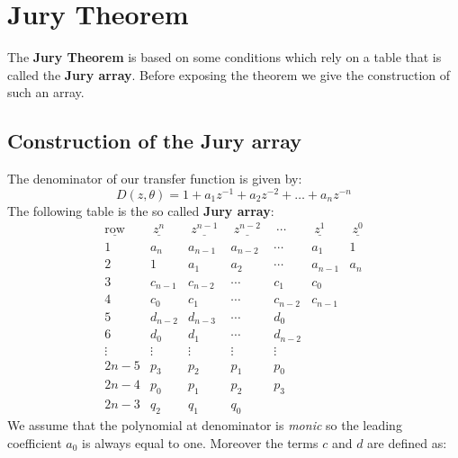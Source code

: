 \section{Jury Theorem}
The \textbf{Jury Theorem} is based on some conditions which rely on a table that is called the \textbf{Jury array}. Before exposing the theorem we give the construction of such an array. 

\subsection{Construction of the Jury array}
The denominator of our transfer function is given by: 
\begin{equation}
    D(z,\theta)=1+a_1{z^{-1}}+a_2{z^{-2}}+\dots+a_n{z^{-n}}
\end{equation}
The following table is the so called \textbf{Jury array}:
\begin{equation}
    {\displaystyle {\begin{array}{lcccccc}
        {\underline {\text{row}}} &\ {\underline {z^{n}}}\ &\ {\underline {z^{n-1}}}\ &\ {\underline {z^{n-2}}}\ &\ \cdots \ &\ {\underline {z^{1}}}\ &\ {\underline {z^{0}}} \\[8pt]
        1 & a_{n} & a_{n-1} & a_{n-2} & \cdots & a_{1} & 1 \\[4pt]
        2 & 1 & a_{1} & a_{2} & \cdots & a_{n-1} & a_{n} \\[10pt]
        3 & c_{n-1} & c_{n-2} & \cdots & c_{1} & c_{0} \\[4pt]
        4 & c_{0} & c_{1} & \cdots & c_{n-2} & c_{n-1} \\[10pt]
        5 & d_{n-2} & d_{n-3} & \cdots & d_{0} & \\[4pt]
        6 & d_{0} & d_{1} & \cdots & d_{n-2} & \\[10pt]
        \!\vdots & \vdots & \vdots & \vdots & \vdots && \\[10pt]
        2n-5 & p_{3} & p_{2} & p_{1} & p_{0} && \\[4pt]
        2n-4 & p_{0} & p_{1} & p_{2} & p_{3} && \\[10pt]
        2n-3 & q_{2} & q_{1} & q_{0} &&&
        \end{array}}}
\end{equation}
We assume that the polynomial at denominator is \textit{monic} so the leading coefficient $a_0$ is always equal to one. Moreover the terms $c$ and $d$ are defined as: 
